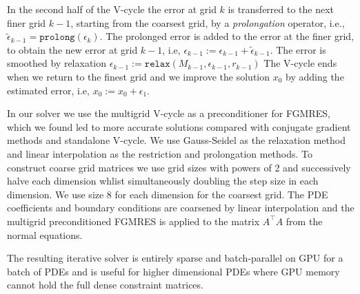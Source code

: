 In the second half of the V-cycle the error at grid $k$ is transferred to the next finer grid $k-1$, starting from the coarsest grid, by a \emph{prolongation} operator, i.e., $\tilde{\epsilon}_{k-1} = \texttt{prolong}(\epsilon_k)$.
The prolonged error is added to the error at the finer grid, to obtain the new error at grid $k-1$, i.e, $\epsilon_{k-1} :=\epsilon_{k-1} + \tilde{\epsilon}_{k-1}$.
The error is smoothed by relaxation $\epsilon_{k-1} := \texttt{relax}(M_{k-1}, \epsilon_{k-1}, r_{k-1})$
The V-cycle ends when we return to the finest grid and we improve the solution $x_0$ by adding the estimated error, i.e, $x_0 := x_0 + \epsilon_1.$

In our solver we use the multigrid V-cycle as a preconditioner for FGMRES, which we found led to more accurate solutions compared with conjugate gradient methods and standalone V-cycle.
We use Gauss-Seidel as the relaxation method and linear interpolation as the restriction and prolongation methods.
To construct coarse grid matrices we use grid sizes with powers of 2 and successively halve each dimension whlist simultaneously doubling the step size in each dimension.
We use size 8 for each dimension for the coarsest grid.
The PDE coefficients and boundary conditions are coarsened by linear interpolation and the multigrid preconditioned FGMRES is applied to the matrix $A^\intercal A$ from the normal equations.

The resulting iterative solver is entirely sparse and batch-parallel on GPU for a batch of PDEs and is useful for higher dimensional PDEs where GPU memory cannot hold the full dense constraint matrices.



